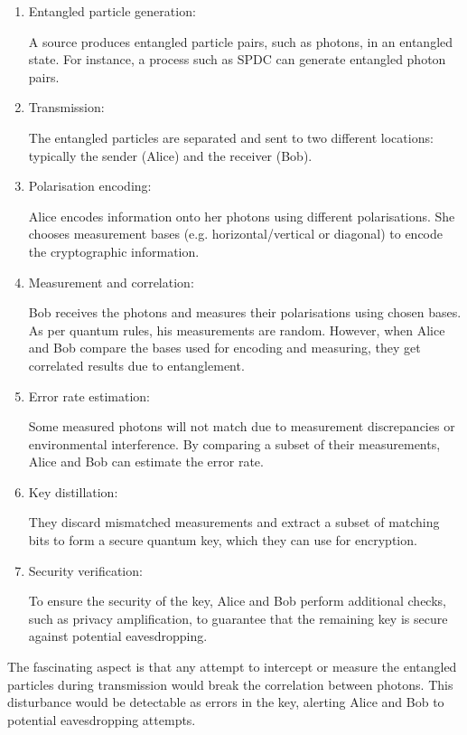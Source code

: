 \documentclass[12pt,a4paper]{article}
\begin{document}
\begin{enumerate}
\item Entangled particle generation:

A source produces entangled particle pairs, such as photons, in an entangled state. For instance, a process such as SPDC can generate entangled photon pairs.

\item Transmission:

The entangled particles are separated and sent to two different locations: typically the sender (Alice) and the receiver (Bob).

\item Polarisation encoding:

Alice encodes information onto her photons using different polarisations. She chooses measurement bases (e.g. horizontal/vertical or diagonal) to encode the cryptographic information.

\item Measurement and correlation:

Bob receives the photons and measures their polarisations using chosen bases. As per quantum rules, his measurements are random. However, when Alice and Bob compare the bases used for encoding and measuring, they get correlated results due to entanglement.

\item Error rate estimation:

Some measured photons will not match due to measurement discrepancies or environmental interference. By comparing a subset of their measurements, Alice and Bob can estimate the error rate.

\item Key distillation:

They discard mismatched measurements and extract a subset of matching bits to form a secure quantum key, which they can use for encryption.

\item Security verification:

To ensure the security of the key, Alice and Bob perform additional checks, such as privacy amplification, to guarantee that the remaining key is secure against potential eavesdropping.
\end{enumerate}

The fascinating aspect is that any attempt to intercept or measure the entangled particles during transmission would break the correlation between photons. This disturbance would be detectable as errors in the key, alerting Alice and Bob to potential eavesdropping attempts.
\pagebreak
\end{document}
